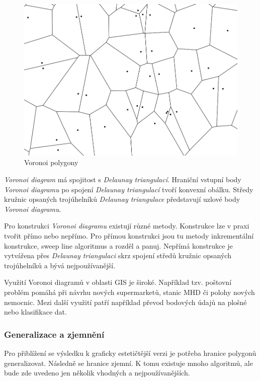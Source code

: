 \begin{figure}[H] \centering
    \includegraphics[width=400pt]{./pictures/voronoi.png}
    \caption[Voronoi polygony]{Voronoi polygony}
	\label{fig:voronoi}              
\end{figure}   

\textit{Voronoi diagram} má spojitost s \textit{Delaunay triangulací}. Hraniční vstupní body
\textit{Voronoi diagramu} po spojení \textit{Delaunay triangulací} tvoří konvexní obálku.
Středy kružnic opsaných trojúhelníků \textit{Delaunay triangulace} představují uzlové body
\textit{Voronoi diagramu}.

Pro konstrukci \textit{Voronoi diagramu} existují různé metody. Konstrukce lze v praxi tvořit přímo nebo nepřímo.
Pro přímou konstrukci jsou tu metody inkrementální konstrukce, sweep line algoritmus a
rozděl a panuj. Nepřímá konstrukce je vytvářena přes \textit{Delaunay triangulaci} skrz spojení středů
kružnic opsaných trojúhelníků a bývá nejpoužívanější. 

Využití Voronoi diagramů v oblasti GIS je široké. Například tzv. poštovní problém
pomáhá při návrhu nových supermarketů, stanic MHD či polohy nových nemocnic.
Mezi další využití patří například převod bodových údajů na plošné
nebo klasifikace dat. \cite{bayer-voronoi}

\subsubsection{Generalizace a zjemnění}
\label{generalizace_zjemneni}

Pro přiblížení se výsledku k graficky estetičtější verzi je potřeba hranice polygonů
generalizovat. Následně se hranice zjemní. K tomu existuje mnoho algoritmů, ale bude zde uvedeno
jen několik vhodných a nejpoužívanějších.


